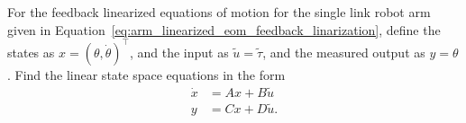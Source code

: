 For the feedback linearized equations of motion for the single link robot arm given in Equation~\eqref{eq:arm_linearized_eom_feedback_linarization}, define the states as $x=(\theta,\dot{\theta})^{\top}$, and the input as $\tilde{u}=\tilde{\tau}$, and the measured output as $y=\theta$.  Find the linear state space equations in the form
\begin{align*}
	\dot{x} &= Ax + B\tilde{u} \\
	y &= Cx + D\tilde{u}.
\end{align*} 
